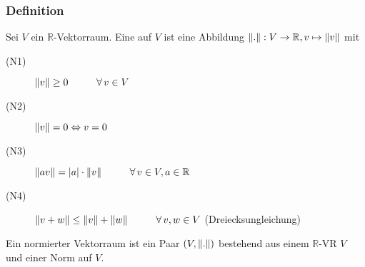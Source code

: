\subsubsection[Norm]{Definition} %
\label{ssub:definition}
Sei $ V$ ein $\mathbb{R} $-Vektorraum. Eine  auf $ V$ ist eine Abbildung $\norm{.}:V \to \mathbb{R} , v \mapsto \norm{v}$ mit
\begin{description}
	\item[(N1)]$\norm{v} \geq 0 \hspace{1cm} \forall \, v \in V$ 
	\item[(N2)] $\norm{v}=0 \Leftrightarrow v=0$
	\item[(N3)] $\norm{av}=|a|\cdot \norm{v} \hspace{1cm}  \forall\,v \in V, a \in \mathbb{R}$
	\item[(N4)] $\norm{v+w} \leq \norm{v}+\norm{w} \hspace{1cm} \forall\, v,w \in V$ \hspace{1cm} (Dreiecksungleichung) 
\end{description} 
Ein normierter Vektorraum ist ein Paar $(V,\norm{.})$ bestehend aus einem $\mathbb{R}$-VR $ V$ und einer Norm auf $ V$.

